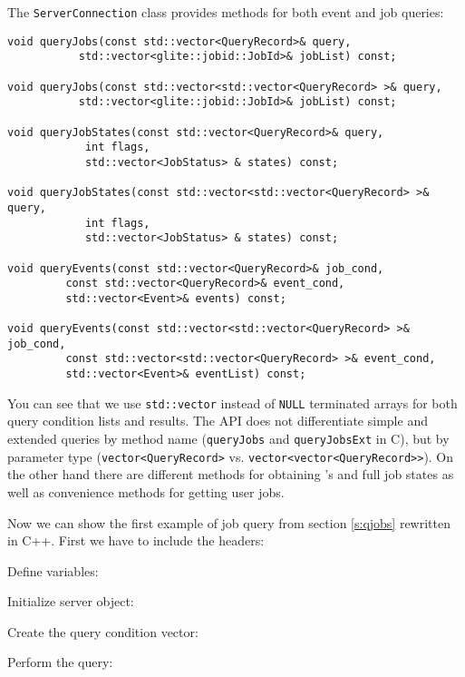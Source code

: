 The \verb'ServerConnection' class provides methods for both event and job queries:
\begin{lstlisting}
void queryJobs(const std::vector<QueryRecord>& query,
	       std::vector<glite::jobid::JobId>& jobList) const;

void queryJobs(const std::vector<std::vector<QueryRecord> >& query,
	       std::vector<glite::jobid::JobId>& jobList) const;

void queryJobStates(const std::vector<QueryRecord>& query, 
		    int flags,
		    std::vector<JobStatus> & states) const;

void queryJobStates(const std::vector<std::vector<QueryRecord> >& query, 
		    int flags,
		    std::vector<JobStatus> & states) const;

void queryEvents(const std::vector<QueryRecord>& job_cond,
		 const std::vector<QueryRecord>& event_cond,
		 std::vector<Event>& events) const;

void queryEvents(const std::vector<std::vector<QueryRecord> >& job_cond,
		 const std::vector<std::vector<QueryRecord> >& event_cond,
		 std::vector<Event>& eventList) const;
\end{lstlisting}
You can see that we use \verb'std::vector' instead of \verb'NULL' terminated
arrays for both query condition lists and results. The API does
not differentiate simple and extended queries by method name
(\verb'queryJobs' and \verb'queryJobsExt' in C), but by parameter
type (\verb'vector<QueryRecord>'
vs. \verb'vector<vector<QueryRecord>>'). On the other hand there are
different methods for obtaining \jobid's and full job states as well 
as convenience methods for getting user jobs. 

Now we can show the first example of job query from section
\ref{s:qjobs} rewritten in C++. First we have to include the headers:


Define variables:


Initialize server object:


Create the query condition vector:


Perform the query:


